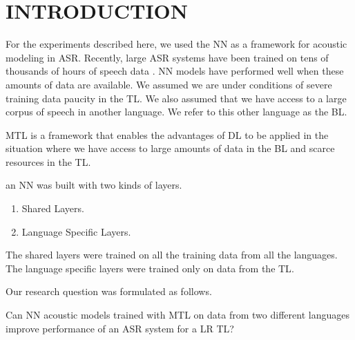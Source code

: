 \section{INTRODUCTION}
\label{sec-2}

For the experiments described here, we used the \gls{NN} as a framework for acoustic modeling in \gls{ASR}. 
Recently, large \gls{ASR} systems have been trained on tens of thousands of hours of speech data \cite{Heigold13multilingualacoustic}. 
\gls{NN} models have performed well when these amounts of data are available. 
We assumed we are under conditions of severe training data paucity in the \gls{TL}.
We also assumed that we have access to a large corpus of speech in another language. 
We refer to this other language as the \gls{BL}.

\gls{MTL}\cite{Caruana93multitasklearning:} is a framework that enables the advantages of \gls{DL} to be applied in the situation where we have access to large amounts of data in the \gls{BL} and scarce   resources in the \gls{TL}.  

an \gls{NN} was built with two kinds of layers.
\begin{enumerate}
\item Shared Layers.
\item Language Specific Layers.
\end{enumerate}

The shared layers were trained on all the training data from all the languages.
The language specific layers were trained only on data from the \gls{TL}.

Our research question was formulated as follows.

Can \gls{NN} acoustic models trained with \gls{MTL} on data  from  two different languages improve performance of an  \gls{ASR} system for a \gls{LR} \gls{TL}?
